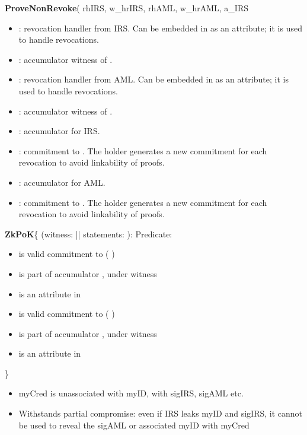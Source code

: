 \vspace{.5em}\textbf{ProveNonRevoke}( rhIRS, w\_hrIRS, rhAML, w\_hrAML, a\_IRS
\begin{itemize}
    \item {}: revocation handler from IRS. 
    Can be embedded in  as an attribute; it is used to handle revocations.
    \item {}: accumulator witness of .
    \item {}: revocation handler from AML. 
    Can be embedded in  as an attribute; it is used to handle revocations.
    \item {}: accumulator witness of .
    \item {}: accumulator for IRS.
    \item {}: commitment to . The holder generates a new commitment for each revocation to avoid linkability of proofs. 
    \item {}: accumulator for AML.
    \item {}: commitment to . The holder generates a new commitment for each revocation to avoid linkability of proofs. 
\end{itemize}


\vspace{.5em}
\textbf{ZkPoK}\{ (witness: || statements:  ):
Predicate:
\begin{itemize}
	\item {} is valid commitment to (  )
	\item {} is part of accumulator , under witness 
	\item {} is an attribute in 
	\item {} is valid commitment to (  )
	\item {} is part of accumulator , under witness 
	\item {} is an attribute in 
\end{itemize}
\}


\begin{itemize}
	\item myCred is unassociated with myID, with sigIRS, sigAML etc.
    \item Withstands partial compromise: even if IRS leaks myID and sigIRS, it cannot be used to reveal the sigAML or associated myID with myCred
\end{itemize}
